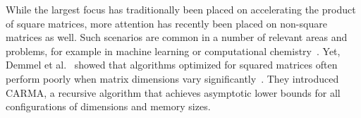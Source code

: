\documentclass[sigplan,review,anonymous,10pt]{acmart}\settopmatter{printfolios=true,printccs=false,printacmref=false}
\newcommand\greg[1]{\textcolor{blue}{[Greg: #1]}}
\newcommand\mac[1]{\textcolor{red}{[Mac: #1]}}
\begin{document}
While the largest focus has traditionally been
placed on accelerating the product of square matrices, more attention has
recently been placed on
non-square matrices as well. Such scenarios are common in a number of
relevant areas and problems, for example in machine learning
\cite{rectangularML} or computational chemistry~\cite{rectangularChemistry}.
%
Yet, Demmel et al.~\cite{CARMA} showed
that algorithms optimized for squared matrices often perform poorly
when matrix dimensions vary significantly~\cite{CARMA}. They introduced CARMA, 
a recursive algorithm that achieves asymptotic lower bounds for all
configurations of dimensions and memory sizes.  


%
\end{document}
